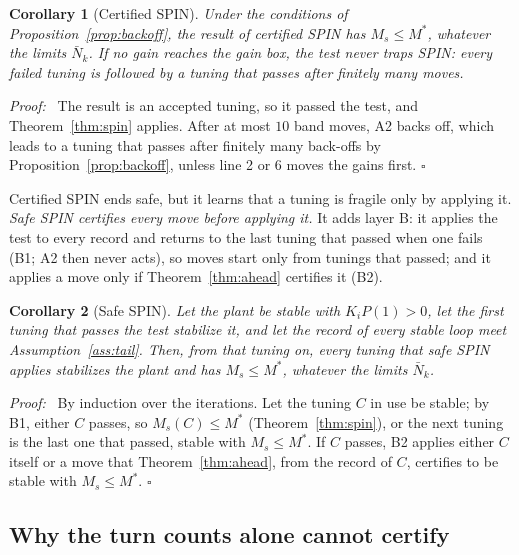 \documentclass[letterpaper, 10 pt, conference]{ieeeconf}
\newtheorem{corollary}{Corollary}
\renewenvironment{proof}{\noindent\textit{Proof:}\ }{\hfill$\square$\par\smallskip}
\newcommand{\spin}{SPIN\xspace}
\begin{document}
\begin{corollary}[Certified \spin]
\label{cor:spin}
Under the conditions of Proposition~\ref{prop:backoff}, the result of
certified \spin has $M_s\le M^*$, whatever the limits $\bar N_k$. If no
gain reaches the gain box, the test never traps \spin: every failed
tuning is followed by a tuning that passes after finitely many moves.
\end{corollary}

\begin{proof}
The result is an accepted tuning, so it passed the test, and
Theorem~\ref{thm:spin} applies. After at most $10$ band moves, A2 backs
off, which leads to a tuning that passes after finitely many back-offs
by Proposition~\ref{prop:backoff}, unless line 2 or 6 moves the gains
first.
\end{proof}

Certified \spin ends safe, but it learns that a tuning is fragile only
by applying it. \emph{Safe \spin certifies every move before applying
it.} It adds layer B: it applies the test to every record and returns to
the last tuning that passed when one fails (B1; A2 then never acts), so
moves start only from tunings that passed; and it applies a move only if
Theorem~\ref{thm:ahead} certifies it (B2).

\begin{corollary}[Safe \spin]
\label{cor:safe}
Let the plant be stable with $K_iP(1)>0$, let the first tuning that
passes the test stabilize it, and let the record of every stable loop
meet Assumption~\ref{ass:tail}. Then, from that tuning on, every tuning
that safe \spin applies stabilizes the plant and has $M_s\le M^*$,
whatever the limits $\bar N_k$.
\end{corollary}

\begin{proof}
By induction over the iterations. Let the tuning $C$ in use be stable;
by B1, either $C$ passes, so $M_s(C)\le M^*$ (Theorem~\ref{thm:spin}),
or the next tuning is the last one that passed, stable with
$M_s\le M^*$. If $C$ passes, B2 applies either $C$ itself or a move that
Theorem~\ref{thm:ahead}, from the record of $C$, certifies to be stable
with $M_s\le M^*$.
\end{proof}

\subsection{Why the turn counts alone cannot certify}
\end{document}
